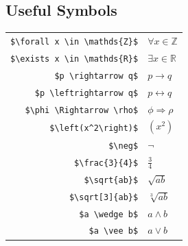 \documentclass[letter]{article}
\theoremstyle{definition}
\newcommand*\tbs[0]{\textbackslash}
\begin{document}
\subsection*{Useful Symbols}

\begin{table}[H]
  \center
  \begin{tabular}{r|l}
    \texttt{\$\tbs forall x \tbs in \tbs mathds\{Z\}\$} & $\forall x \in \mathds{Z}$ \\
    \texttt{\$\tbs exists x \tbs in \tbs mathds\{R\}\$} & $\exists x \in \mathds{R}$ \\
    \texttt{\$p \tbs rightarrow q\$}                    & $p \rightarrow q$     \\
    \texttt{\$p \tbs leftrightarrow q\$}                & $p \leftrightarrow q$ \\
    \texttt{\$\tbs phi \tbs Rightarrow \tbs rho\$}      & $\phi\Rightarrow\rho$ \\
    \texttt{\$\tbs left(x\^{}2\tbs right)\$}            & $\left(x^2\right)$    \\
    \texttt{\$\tbs neg\$}                               & $\neg$                \\
    \texttt{\$\tbs frac\{3\}\{4\}\$}                    & $\frac{3}{4}$         \\
    \texttt{\$\tbs sqrt\{ab\}\$}                        & $\sqrt{ab}$           \\
    \texttt{\$\tbs sqrt[3]\{ab\}\$}                     & $\sqrt[3]{ab}$        \\
    \texttt{\$a \tbs wedge b\$}                         & $a \wedge b$          \\
    \texttt{\$a \tbs vee b\$}                           & $a \vee b$            \\
  \end{tabular}
\end{table}
\end{document}
